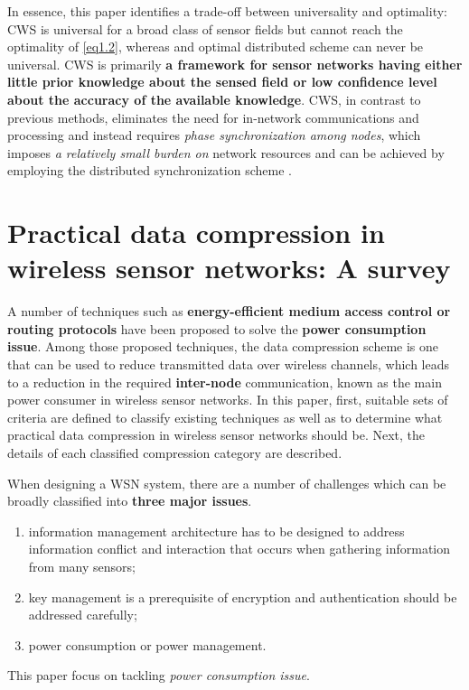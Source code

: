In essence, this paper identifies a trade-off between universality and optimality: CWS is universal for a broad class of sensor fields but cannot reach the optimality of \cref{eq1.2}, whereas and optimal distributed scheme can never be universal. CWS is primarily \textbf{\textcolor[rgb]{1,0,0}{a framework for sensor networks having either little prior knowledge about the sensed field or low confidence level about the accuracy of the available knowledge}}. CWS, in contrast to previous methods, eliminates the need for in-network communications and processing and instead requires \emph{\textcolor[rgb]{1,0,0}{phase synchronization among nodes}}, which imposes \emph{\textcolor[rgb]{1,0,0}{a relatively small burden on}} network resources and can be achieved by employing the distributed synchronization scheme \cite{Mudumbai2005}. 


\section{Practical data compression in wireless sensor networks: A survey}
\label{sec1.2}
A number of techniques such as \textbf{\textcolor[rgb]{1,0,0}{energy-efficient medium access control or routing protocols}} have been proposed to solve the \textbf{\textcolor[rgb]{1,0,0}{power consumption issue}}. Among those proposed techniques, the data compression scheme is one that can be used to reduce transmitted data over wireless channels, which leads to a reduction in the required \textbf{\textcolor[rgb]{1,0,0}{inter-node}} communication, known as the main power consumer in wireless sensor networks. In this paper, first, suitable sets of criteria are defined to classify existing techniques as well as to determine what practical data compression in wireless sensor networks should be. Next, the details of each classified compression category are described.

When designing a WSN system, there are a number of challenges which can be broadly classified into \textbf{\textcolor[rgb]{0,0,1}{three major issues}}.
\begin{enumerate}
    \item information management architecture has to be designed to address information conflict and interaction that occurs when gathering information from many sensors;
    \item key management is a prerequisite of encryption and authentication should be addressed carefully;
    \item power consumption or power management.
\end{enumerate}
This paper focus on tackling \emph{\textcolor[rgb]{1,0,0}{power consumption issue}}.

